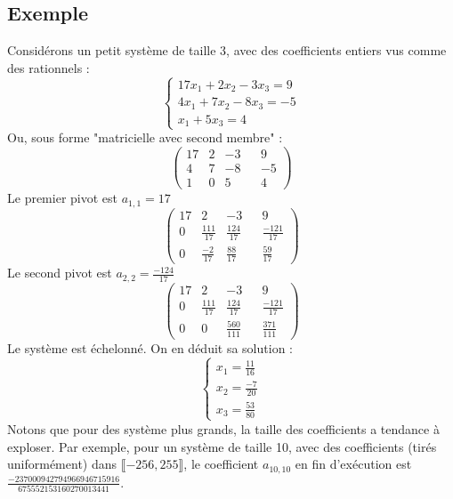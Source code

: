 \documentclass[french]{article}
\begin{document}
\subsection{Exemple}
Considérons un petit système de taille 3, avec des coefficients entiers vus comme des rationnels :
\begin{equation*}
	\begin{cases}
		17 x_1 + 2 x_2 - 3 x_3 = 9\\
		4 x_1 + 7 x_2 - 8 x_3 = -5\\
		x_1 + 5 x_3 = 4
	\end{cases}
\end{equation*}
Ou, sous forme "matricielle avec second membre" :
\begin{equation*}
	\begin{pmatrix}
		17 & 2 & -3 & & 9\\
		4 & 7 & -8 & & -5\\
		1 & 0 & 5 & & 4
	\end{pmatrix}
\end{equation*}
Le premier pivot est $a_{1,1} = 17$
\begin{equation*}
	\begin{pmatrix}
		17 & 2 & -3 & & 9\\
		0 & \frac{111}{17} & \frac{124}{17} & & \frac{-121}{17}\\
		0 & \frac{-2}{17} & \frac{88}{17} & & \frac{59}{17}
	\end{pmatrix}
\end{equation*}
Le second pivot est $a_{2,2} = \frac{-124}{17}$
\begin{equation*}
	\begin{pmatrix}
		17 & 2 & -3 & & 9\\
		0 & \frac{111}{17} & \frac{124}{17} & & \frac{-121}{17}\\
		0 & 0 & \frac{560}{111} & & \frac{371}{111}
	\end{pmatrix}
\end{equation*}
Le système est échelonné. On en déduit sa solution :
\begin{equation*}
	\begin{cases}
		x_1 = \frac{11}{16}\\
		x_2 = \frac{-7}{20}\\
		x_3 = \frac{53}{80}
	\end{cases}
\end{equation*}
Notons que pour des système plus grands, la taille des coefficients a tendance à exploser. Par exemple, pour un système de taille 10, avec des coefficients (tirés uniformément) dans $\llbracket-256,255\rrbracket$, le coefficient $a_{10,10}$ en fin d'exécution est $\frac{-237000942794966946715916}{675552153160270013441}$.
\end{document}
